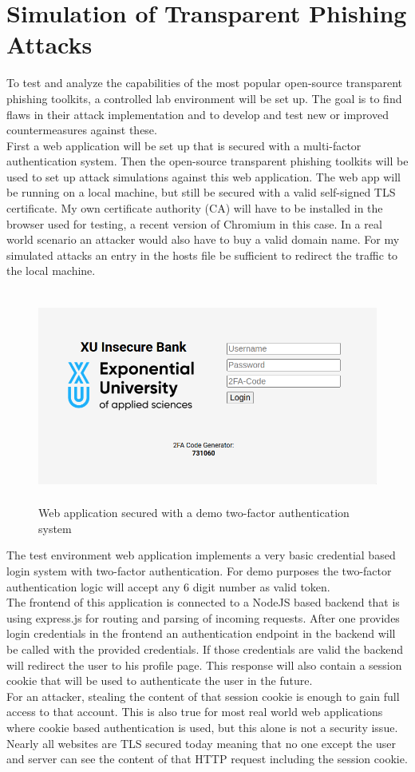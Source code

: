 \documentclass[12pt]{scrbook}
\begin{document}
\section{Simulation of Transparent Phishing Attacks}
To test and analyze the capabilities of the most popular open-source
transparent phishing toolkits, a controlled lab environment will be set up. The
goal is to find flaws in their attack implementation and to develop and test new
or improved countermeasures against these.\\ First a web application
will be set up that is secured with a multi-factor authentication system. Then
the open-source transparent phishing toolkits will be used to set up attack
simulations against this web application. The web app will be
running on a local machine, but still be secured with a valid self-signed TLS
certificate. My own certificate authority (CA) will have to be installed in the
browser used for testing, a recent version of Chromium in this case. In a
real world scenario an attacker would also have to buy a valid domain name. For
my simulated attacks an entry in the hosts file be sufficient to redirect the
traffic to the local machine.
\begin{figure}[!htb] \centering
	\includegraphics[height=7cm]{./images/2fa_app.png}
    \caption{Web application secured with a demo two-factor authentication system}
\end{figure}
The test environment web application implements a very basic credential based login
system with two-factor authentication. For demo purposes the two-factor
authentication logic will accept any 6 digit number as valid token.\\The
frontend of this application is connected to a NodeJS based backend that is
using express.js for routing and parsing of incoming requests. After one
provides login credentials in the frontend an authentication endpoint in the
backend will be called with the provided credentials. If those credentials are
valid the backend will redirect the user to his profile page. This response will
also contain a session cookie that will be used to authenticate the user in the
future.\\For an attacker, stealing the content of that session cookie is enough
to gain full access to that account. This is also true for most real world web
applications where cookie based authentication is used, but this alone is not a
security issue. Nearly all websites are TLS secured today meaning that no one except the user and server can see the content of that HTTP request including the session cookie.
\end{document}
